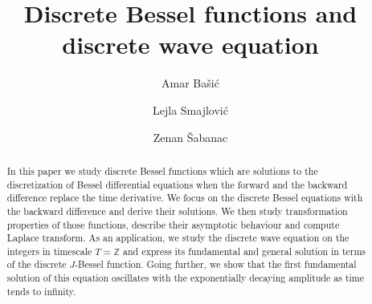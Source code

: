 \documentclass[12pt]{amsart}
\numberwithin{equation}{section}
\begin{document}
\title[Discrete Bessel Functions]{Discrete Bessel functions and
discrete wave equation}
\author[A. Ba\v{s}i\'{c}]{Amar Ba\v{s}i\'{c}}
\address{Faculty of Electrical Engineering\\
University of Sarajevo\\
Zmaja od Bosne bb\\
71 000 Sarajevo\\
Bosnia and Herzegovina}
\author[L. Smajlovi\'{c}]{Lejla Smajlovi\'{c}}
\address{School of Economics and Business\\
University of Sarajevo\\
Trg Oslobodjenja Alija Izetbegovi\'{c} 1\\
71 000 Sarajevo\\
Bosnia and Herzegovina}
\author[Z. \v{S}abanac]{Zenan \v{S}abanac}
\address{Department of Mathematics and Computer Science\\
University of Sarajevo\\
Zmaja od Bosne 35\\
71 000 Sarajevo\\
Bosnia and Herzegovina}

\begin{abstract}
In this paper we study discrete Bessel functions which are solutions to the discretization of Bessel differential equations when the forward and the backward difference replace the time derivative. We focus on the discrete Bessel equations with the backward difference and derive their solutions.
We then study transformation properties of those functions, describe their asymptotic behaviour and compute Laplace transform.
As an application, we study the discrete wave equation on the integers in timescale $T=\mathbb{Z}$ and express its fundamental and general solution in terms of the discrete $J$-Bessel function. Going further, we show that the first fundamental solution of this equation oscillates with the exponentially decaying amplitude as time tends to infinity.
\end{abstract}
\end{document}
